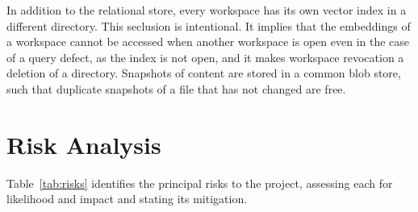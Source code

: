 \documentclass{FastFyp}
\begin{document}
In addition to the relational store, every workspace has its own vector index in a different directory. This seclusion is intentional. It implies that the embeddings of a workspace cannot be accessed when another workspace is open even in the case of a query defect, as the index is not open, and it makes workspace revocation a deletion of a directory. Snapshots of content are stored in a common blob store, such that duplicate snapshots of a file that has not changed are free.

\section{Risk Analysis}
Table~\ref{tab:risks} identifies the principal risks to the project, assessing each for likelihood and impact and stating its mitigation.
\end{document}
